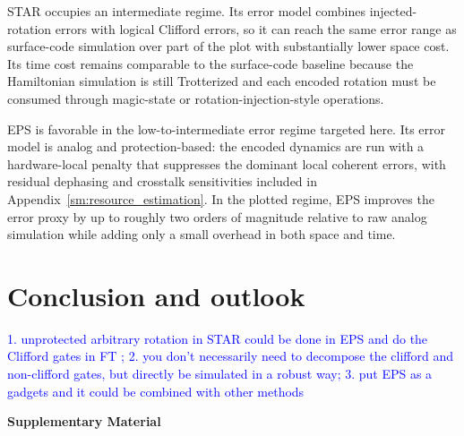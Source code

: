 \documentclass[%
10pt,tightenlines,
superscriptaddress,
 amsmath,amssymb,
 aps,
pra,
]{revtex4-2}
\newcommand{\sy}[1]{\textcolor{blue}{#1}}
\begin{document}
STAR occupies an intermediate regime. Its error model combines injected-rotation errors with logical Clifford errors, so it can reach the same error range as surface-code simulation over part of the plot with substantially lower space cost. Its time cost remains comparable to the surface-code baseline because the Hamiltonian simulation is still Trotterized and each encoded rotation must be consumed through magic-state or rotation-injection-style operations.

EPS is favorable in the low-to-intermediate error regime targeted here. Its error model is analog and protection-based: the encoded dynamics are run with a hardware-local penalty that suppresses the dominant local coherent errors, with residual dephasing and crosstalk sensitivities included in Appendix~\ref{sm:resource_estimation}. In the plotted regime, EPS improves the error proxy by up to roughly two orders of magnitude relative to raw analog simulation while adding only a small overhead in both space and time.

\section{Conclusion and outlook}
\sy{1. unprotected arbitrary rotation in STAR could be done in EPS and do the Clifford gates in FT ; 2. you don't necessarily need to decompose the clifford and non-clifford gates, but directly be simulated in a robust way; 3. put EPS as a gadgets and it could be combined with other methods}

\clearpage



\clearpage
\onecolumngrid
\begin{center}
\textbf{\large Supplementary Material}
\end{center}
\setcounter{section}{0}
\setcounter{equation}{0}
\setcounter{figure}{0}
\setcounter{table}{0}
\renewcommand{\theequation}{S\arabic{equation}}
\renewcommand{\thefigure}{S\arabic{figure}}
\renewcommand{\thetable}{S\arabic{table}}
\renewcommand{\thesection}{S\arabic{section}}
\end{document}
